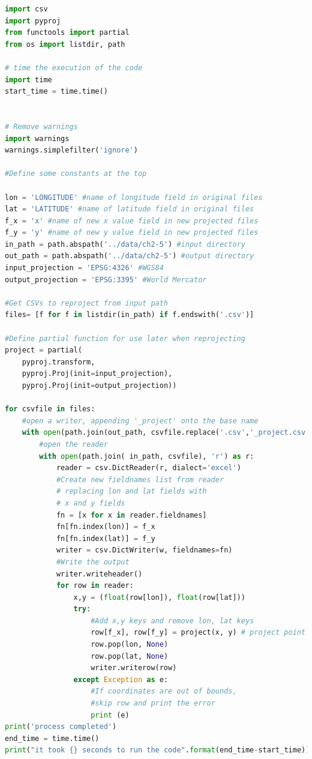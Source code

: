 \documentclass[a4paper , 12pt]{book}
\begin{document}
\begin{center}
\begin{lstlisting}[language=Python, frame=single]
import csv
import pyproj
from functools import partial
from os import listdir, path

# time the execution of the code
import time
start_time = time.time()


# Remove warnings
import warnings
warnings.simplefilter('ignore')

#Define some constants at the top

lon = 'LONGITUDE' #name of longitude field in original files
lat = 'LATITUDE' #name of latitude field in original files
f_x = 'x' #name of new x value field in new projected files
f_y = 'y' #name of new y value field in new projected files
in_path = path.abspath('../data/ch2-5') #input directory
out_path = path.abspath('../data/ch2-5') #output directory
input_projection = 'EPSG:4326' #WGS84
output_projection = 'EPSG:3395' #World Mercator

#Get CSVs to reproject from input path
files= [f for f in listdir(in_path) if f.endswith('.csv')]

#Define partial function for use later when reprojecting
project = partial(
    pyproj.transform,
    pyproj.Proj(init=input_projection),
    pyproj.Proj(init=output_projection))

for csvfile in files:
    #open a writer, appending '_project' onto the base name
    with open(path.join(out_path, csvfile.replace('.csv','_project.csv')), 'w') as w:
        #open the reader
        with open(path.join( in_path, csvfile), 'r') as r:
            reader = csv.DictReader(r, dialect='excel')
            #Create new fieldnames list from reader
            # replacing lon and lat fields with 
            # x and y fields
            fn = [x for x in reader.fieldnames]
            fn[fn.index(lon)] = f_x
            fn[fn.index(lat)] = f_y
            writer = csv.DictWriter(w, fieldnames=fn)
            #Write the output
            writer.writeheader()
            for row in reader:
                x,y = (float(row[lon]), float(row[lat]))
                try:
                    #Add x,y keys and remove lon, lat keys
                    row[f_x], row[f_y] = project(x, y) # project point
                    row.pop(lon, None)
                    row.pop(lat, None)
                    writer.writerow(row)
                except Exception as e:
                    #If coordinates are out of bounds, 
                    #skip row and print the error
                    print (e)
print('process completed')
end_time = time.time()
print("it took {} seconds to run the code".format(end_time-start_time))
\end{lstlisting}
\end{center}
\end{document}
